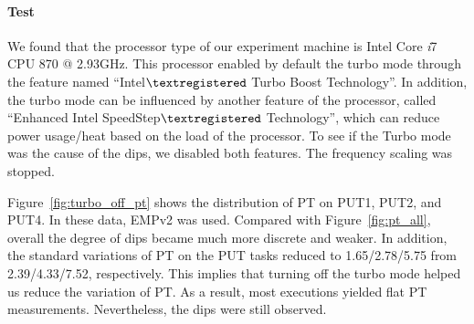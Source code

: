\documentclass[10pt]{article}
\begin{document}
\paragraph{Test} 
We found that the processor type of our experiment machine is Intel Core {\it i}7 CPU 870 @ 2.93GHz. 
This processor enabled by default the turbo mode through the feature named ``Intel$\textregistered$ Turbo Boost Technology''. 
In addition, the turbo mode can be influenced by another feature of the processor, 
called ``Enhanced Intel SpeedStep$\textregistered$ Technology'', which can reduce power usage/heat based on the load of the processor. 
To see if the Turbo mode was the cause of the dips, we disabled both features. The frequency scaling was stopped.

Figure~\ref{fig:turbo_off_pt} shows the distribution of PT on PUT1, PUT2, and PUT4. 
In these data, EMPv2 was used. 
Compared with Figure~\ref{fig:pt_all}, overall the degree of dips became much more discrete and weaker. 
In addition, the standard variations of PT on the PUT tasks reduced to 
1.65/2.78/5.75 from 2.39/4.33/7.52, respectively. 
This implies that turning off the turbo mode helped us reduce the variation of PT. 
As a result, most executions yielded flat PT measurements.
Nevertheless, the dips were still observed.
\end{document}
